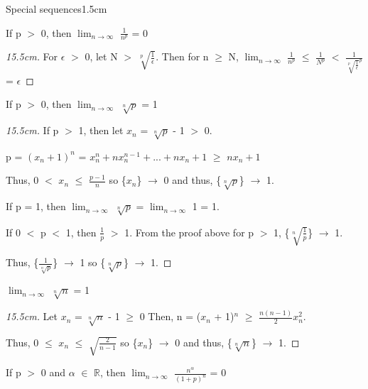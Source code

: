 	\begin{ltheorem}{Special sequences}{1.5cm}
		\item If p $>$ 0, then $\lim_{n \rightarrow \infty}$ $\frac{1}{n^p}$ = 0
		
			\begin{proof}[15.5cm]
				For $\epsilon$ $>$ 0, let N $>$ $\sqrt[p]{\frac{1}{\epsilon}}$.
				Then for n $\geq$ N,
				$\lim_{n \rightarrow \infty}$ $\frac{1}{n^p}$
				$\leq$ $\frac{1}{N^p}$
				$<$ $\frac{1}{\sqrt[p]{\frac{1}{\epsilon}}^p}$ = $\epsilon$				
			\end{proof}

		\item If p $>$ 0, then $\lim_{n \rightarrow \infty}$ $\sqrt[n]{p}$ = 1
		
			\begin{proof}[15.5cm]
				If p $>$ 1, then let $x_n$ = $\sqrt[n]{p}$ - 1 $>$ 0.

					\hspace{1cm}
					p = $(x_n + 1)^n$
					= $x_n^n + nx_n^{n-1} + ... + nx_n + 1$
					$\geq$ $nx_n + 1$

					Thus, 0 $<$ $x_n$ $\leq$ $\frac{p-1}{n}$ so
					\{$x_n$\} $\rightarrow$ 0 and thus,
					\{$\sqrt[n]{p}$\} $\rightarrow$ 1.

					If p = 1, then $\lim_{n \rightarrow \infty}$ $\sqrt[n]{p}$
					= $\lim_{n \rightarrow \infty}$ 1 = 1.

					If 0 $<$ p $<$ 1, then $\frac{1}{p}$ $>$ 1.
					From the proof above for p $>$ 1,
					\{$\sqrt[n]{\frac{1}{p}}$\} $\rightarrow$ 1.

					Thus, \{$\frac{1}{\sqrt[n]{p}}$\} $\rightarrow$ 1
					so \{$\sqrt[n]{p}$\} $\rightarrow$ 1.
			\end{proof}

		\item $\lim_{n \rightarrow \infty}$ $\sqrt[n]{n}$ = 1

			\begin{proof}[15.5cm]
				Let $x_n$ = $\sqrt[n]{n}$ - 1 $\geq$ 0
				Then, n = ($x_n$ + 1)$^n$ $\geq$ $\frac{n(n-1)}{2} x_n^2$.

				Thus, 0 $\leq$ $x_n$ $\leq$ $\sqrt{\frac{2}{n-1}}$
				so \{$x_n$\} $\rightarrow$ 0 and thus,
				\{$\sqrt[n]{n}$\} $\rightarrow$ 1.				
			\end{proof}

		\item If p $>$ 0 and $\alpha$ $\in$ $\mathbb{R}$, then
			$\lim_{n \rightarrow \infty}$ $\frac{n^{\alpha}}{(1+p)^n}$ = 0


\end{ltheorem}
